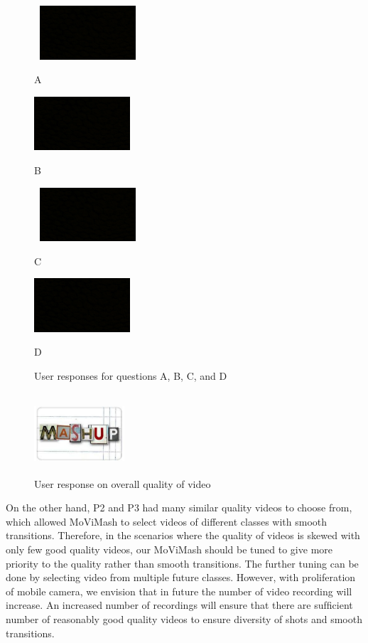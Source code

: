 \documentclass{sig-alternate}
\begin{document}
\begin{figure}[!htb]
  \includegraphics[width=4cm, height=2cm]{44}
  \caption{A }
\endminipage\hfill
{}
  \includegraphics[width=\linewidth, height=2cm]{44}
  \caption{B }
\endminipage\hfill

  \includegraphics[width=4cm, height=2cm]{44}
  \caption{C }
\endminipage\hfill
{}
  \includegraphics[width=\linewidth, height=2cm]{44}
  \caption{D }
\endminipage\hfill
\caption{User responses for questions A, B, C, and D}
\end{figure}

\begin{figure}[!htb]
\centering
\includegraphics[width=0.3\textwidth ,height = 3cm]{11}
\caption{User response on overall quality of video}
\label{fig:figure7}
\end{figure}

On the other hand, P2 and P3 had many similar quality videos to choose from, which allowed MoViMash to select videos of different classes with smooth transitions. Therefore, in the scenarios where the quality of videos is skewed with only few good quality videos, our MoViMash should be tuned to give more priority to the quality rather than smooth transitions. The further tuning can be done by selecting video from multiple future classes. However, with proliferation of mobile camera, we envision that in future the number of video recording will increase. An increased number of recordings will ensure that there are sufﬁcient number of reasonably good quality videos to ensure diversity of shots and smooth transitions.  
\end{document}
